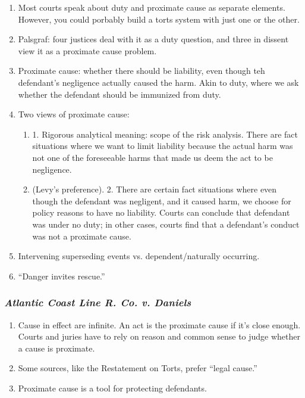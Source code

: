 \begin{enumerate}
    \item Most courts speak about duty and proximate cause as separate 
    elements. However, you could porbably build a torts system with just one 
    or the other.
    \item Palsgraf: four justices deal with it as a duty question, and three 
    in dissent view it as a proximate cause problem.
    \item Proximate cause: whether there should be liability, even though teh 
    defendant's negligence actually caused the harm. Akin to duty, where we 
    ask whether the defendant should be immunized from duty.
    \item Two views of proximate cause:
    \begin{enumerate}
        \item 1. Rigorous analytical meaning: scope of the risk analysis. 
        There are fact situations where we want to limit liability because the 
        actual harm was not one of the foreseeable harms that made us deem the 
        act to be negligence.  \item (Levy's preference). 2. There are certain 
        fact situations where even though the defendant was negligent, and it 
        caused harm, we choose for policy reasons to have no liability. Courts 
        can conclude that defendant was under no duty; in other cases, courts 
        find that a defendant's conduct was not a proximate cause.
    \end{enumerate}
    \item Intervening superseding events vs. dependent/naturally occurring.
    \item ``Danger invites rescue.''
\end{enumerate}

\subsubsection{\emph{Atlantic Coast Line R. Co. v. Daniels}}

\begin{enumerate}
    \item Cause in effect are infinite. An act is the proximate cause if it's 
    close enough. Courts and juries have to rely on reason and common sense to 
    judge whether a cause is proximate.
    \item Some sources, like the Restatement on Torts, prefer ``legal cause.''
    \item Proximate cause is a tool for protecting defendants.
\end{enumerate}

